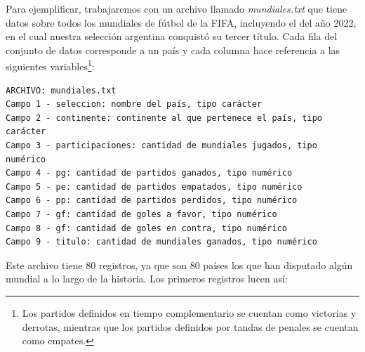\documentclass[
]{book}
\begin{document}
Para ejemplificar, trabajaremos con un archivo llamado \emph{mundiales.txt} que tiene datos sobre todos los mundiales de fútbol de la FIFA, incluyendo el del año 2022, en el cual nuestra selección argentina conquistó su tercer título. Cada fila del conjunto de datos corresponde a un país y cada columna hace referencia a las siguientes variables\footnote{Los partidos definidos en tiempo complementario se cuentan como victorias y derrotas, mientras que los partidos definidos por tandas de penales se cuentan como empates.}:

\begin{verbatim}
ARCHIVO: mundiales.txt
Campo 1 - seleccion: nombre del país, tipo carácter
Campo 2 - continente: continente al que pertenece el país, tipo carácter
Campo 3 - participaciones: cantidad de mundiales jugados, tipo numérico
Campo 4 - pg: cantidad de partidos ganados, tipo numérico
Campo 5 - pe: cantidad de partidos empatados, tipo numérico
Campo 6 - pp: cantidad de partidos perdidos, tipo numérico
Campo 7 - gf: cantidad de goles a favor, tipo numérico
Campo 8 - gf: cantidad de goles en contra, tipo numérico
Campo 9 - titulo: cantidad de mundiales ganados, tipo numérico
\end{verbatim}

Este archivo tiene 80 registros, ya que son 80 países los que han disputado algún mundial a lo largo de la historia. Los primeros registros lucen así:
\end{document}
